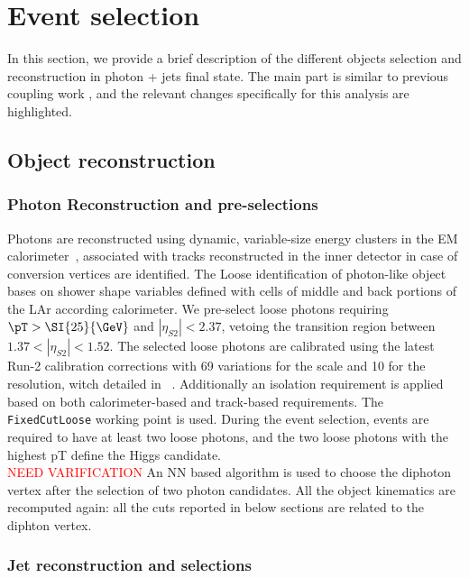 \section{Event selection}
\label{sec:hgam_selection}


In this section, we provide a brief description of the different objects selection and reconstruction in photon + jets final state. The main part is similar to previous \Hyy coupling work \cite{HyyCoupling_140ifb}, and the relevant changes specifically for this analysis are highlighted. 

\subsection{Object reconstruction}
\label{ssec:obj_reconstruction}

\subsubsection{Photon Reconstruction and pre-selections}
Photons are reconstructed using dynamic, variable-size energy clusters in the EM calorimeter~\cite{ATL-PHYS-PUB-2017-022}, associated with tracks reconstructed in the inner detector in case of conversion vertices are identified. The Loose identification of photon-like object bases on shower shape variables defined with cells of middle and back portions of the LAr according calorimeter. We pre-select loose photons requiring $\pT>\SI{25}{\GeV}$ and $|\eta_{S2}|<2.37$, vetoing the transition region between $1.37 < |\eta_{S2}| < 1.52$. The selected loose photons are calibrated using the latest Run-2 calibration corrections with 69 variations for the scale and 10 for the resolution, witch detailed in ~\cite{Andari:2655306}. Additionally an isolation requirement is applied based on both calorimeter-based and track-based requirements. The \texttt{FixedCutLoose} working point is used. During the event selection, events are required to have at least two loose photons, and the two loose photons with the highest pT define the Higgs candidate.\\

\textcolor{red}{NEED VARIFICATION} An NN based algorithm is used to choose the diphoton vertex after the selection of two photon candidates. All the object kinematics are recomputed again: all the cuts reported in below sections are related to the diphton vertex.


\subsubsection{Jet reconstruction and selections}

